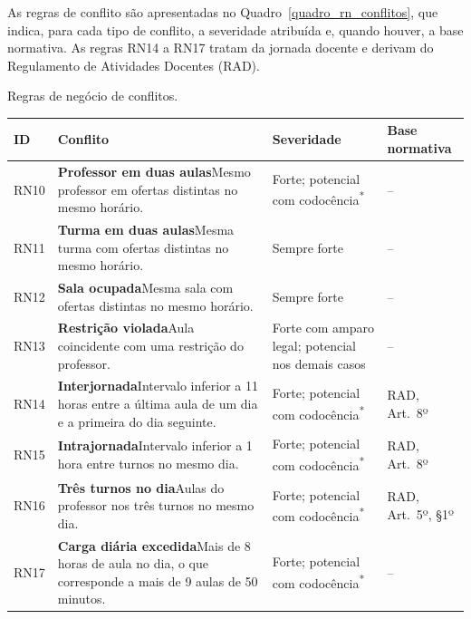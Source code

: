 As regras de conflito são apresentadas no Quadro~\ref{quadro_rn_conflitos}, que indica, para cada tipo de conflito, a severidade atribuída e, quando houver, a base normativa. As regras RN14 a RN17 tratam da jornada docente e derivam do Regulamento de Atividades Docentes (RAD).

\begin{quadro}[H]
\centering
\small
\renewcommand{\arraystretch}{1.25}
\caption{Regras de negócio de conflitos.}
\label{quadro_rn_conflitos}
\begin{tabularx}{\textwidth}{|I|X|>{\raggedright\arraybackslash}m{3.3cm}|>{\raggedright\arraybackslash}m{2.2cm}|}
\hline
\textbf{ID} & \textbf{Conflito} & \textbf{Severidade} & \textbf{Base normativa} \\ \hline
RN10 & \textbf{Professor em duas aulas}\newline Mesmo professor em ofertas distintas no mesmo horário. & Forte; potencial com codocência\textsuperscript{*} & -- \\ \hline
RN11 & \textbf{Turma em duas aulas}\newline Mesma turma com ofertas distintas no mesmo horário. & Sempre forte & -- \\ \hline
RN12 & \textbf{Sala ocupada}\newline Mesma sala com ofertas distintas no mesmo horário. & Sempre forte & -- \\ \hline
RN13 & \textbf{Restrição violada}\newline Aula coincidente com uma restrição do professor. & Forte com amparo legal; potencial nos demais casos & -- \\ \hline
RN14 & \textbf{Interjornada}\newline Intervalo inferior a 11 horas entre a última aula de um dia e a primeira do dia seguinte. & Forte; potencial com codocência\textsuperscript{*} & RAD, Art.~8º \\ \hline
RN15 & \textbf{Intrajornada}\newline Intervalo inferior a 1 hora entre turnos no mesmo dia. & Forte; potencial com codocência\textsuperscript{*} & RAD, Art.~8º \\ \hline
RN16 & \textbf{Três turnos no dia}\newline Aulas do professor nos três turnos no mesmo dia. & Forte; potencial com codocência\textsuperscript{*} & RAD, Art.~5º, §1º \\ \hline
RN17 & \textbf{Carga diária excedida}\newline Mais de 8 horas de aula no dia, o que corresponde a mais de 9 aulas de 50 minutos. & Forte; potencial com codocência\textsuperscript{*} & -- \\ \hline
\end{tabularx}
\end{quadro}

